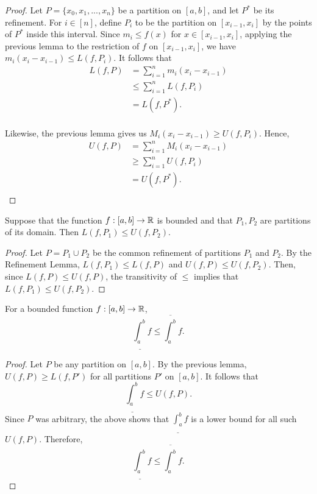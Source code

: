 \documentclass[letterpaper, twoside, 12pt]{book}
\begin{document}
\begin{proof}
    Let \(P = \{x_{0}, x_{1}, ..., x_{n}\}\) be a partition on \([a,b]\),
    and let \(P^*\) be its refinement. For \(i \in [n]\), define \(P_{i}\) 
    to be the partition on \([x_{i-1}, x_{i}]\) by the points of 
    \(P^*\) inside this interval. Since \(m_{i} \leq f(x)\) for \(x \in [x_{i-1},x_{i}]\),
    applying the previous lemma to the restriction of \(f\) on \([x_{i-1}, x_{i}]\),
    we have \( m_{i}(x_{i} - x_{i-1}) \leq L(f, P_{i})\). It follows that
    \begin{align*} 
        L(f, P) &= \sum_{i=1}^{n} m_{i}(x_{i} - x_{i - 1}) \\
                &\leq \sum_{i = 1}^{n} L(f, P_{i}) \\
                &= L(f, P^*). \\
    \end{align*}

    Likewise, the previous lemma gives us \(M_{i}(x_{i} - x_{i-1}) \geq U(f, P_{i})\).
    Hence,
    \begin{align*}
        U(f, P) &= \sum_{i=1}^{n} M_{i}(x_{i} - x_{i-1}) \\
                &\geq \sum_{i=1}^{n} U(f, P_{i}) \\
                &= U(f, P^*). \\
    \end{align*}
\end{proof}


\begin{lemma}[6.3]
  Suppose that the function \(f:[a,b]\to\mathbb R\) is bounded and that
  \(P_1,P_2\) are partitions of its domain. Then \(L(f,P_1)\leq U(f,P_2)\).
\end{lemma}

\begin{proof}
    Let \(P = P_1 \cup P_2\) be the common refinement of partitions \(P_1\)
    and \(P_2\). By the Refinement Lemma, \(L(f, P_{1}) \leq L(f, P)\)
    and \(U(f, P) \leq U(f, P_{2})\). Then, since \(L(f, P) \leq U(f, P)\),
    the transitivity of \(\leq\) implies that \(L(f, P_{1}) \leq U(f, P_{2})\).
\end{proof}


\begin{lemma}[6.4]
  For a bounded function \(f:[a,b]\to\mathbb R\),
  \[
    \underline{\int_a^b} f
      \leq
    \overline{\int_a^b} f
  .\]
\end{lemma}

\begin{proof}
    Let \(P\) be any partition on \([a,b]\). By the previous lemma,
    \(U(f, P) \geq L(f, P')\) for all partitions \(P'\) on \([a,b]\). 
    It follows that
    \[ \underline{\int_a^b} f \leq U(f, P) . \]
    Since \(P\) was arbitrary, the above shows that \(\underline{\int_a^b} f\)
    is a lower bound for all such \(U(f, P)\). Therefore,
    \[ \underline{\int_a^b} f \leq \overline{\int_a^b} f .\]
\end{proof}
\end{document}
